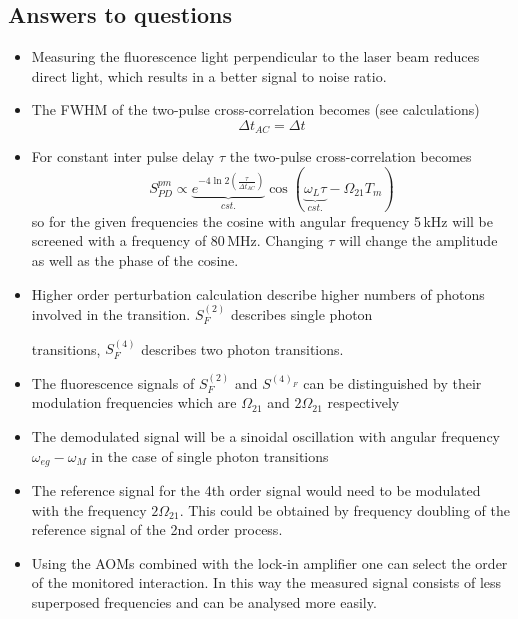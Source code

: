 \documentclass{report}
\begin{document}
\subsection*{Answers to questions}
  \begin{itemize}
    \item Measuring the fluorescence light perpendicular to the laser beam
      reduces direct light, which results in a
      better signal to noise ratio.

    \item The FWHM of the two-pulse cross-correlation 
      becomes (see calculations)
      $$ \Delta t_{AC} = \Delta t$$

    \item For constant inter pulse delay $\tau$ the two-pulse
      cross-correlation becomes
      $$ S^{pm}_{PD} \propto \underbrace{e^{-4\ln2\left(\frac{\tau}{\Delta
        t_{AC}}\right)}}_{cst.} \cos(\underbrace{\omega_L
      \tau}_{cst.}  - \Omega_{21}T_m )$$
      so for the given frequencies the cosine with angular frequency 5\,kHz
      will be screened with a frequency of 80\,MHz. Changing $\tau$ will
      change the amplitude as well as the phase of the cosine.

    \item Higher order perturbation calculation describe higher numbers of
      photons involved in the transition. $S^{(2)}_F$ describes single photon

      transitions, $S^{(4)}_F$ describes two photon transitions.
    \item The fluorescence signals of $S^{(2)}_F$ and $S^{(4)_F}$ can be
      distinguished by their modulation frequencies which are $\Omega_{21}$
      and $2\Omega_{21}$ respectively

    \item The demodulated signal will be a sinoidal oscillation with angular
      frequency $\omega_{eg} - \omega_M$ in the case of single photon
      transitions
      
    \item The reference signal for the 4th order signal would need to be
      modulated with the frequency $2 \Omega_{21}$. This could be obtained by
      frequency doubling of the reference signal of the 2nd order process.

    \item Using the AOMs combined with the lock-in amplifier one can select
      the order of the monitored interaction. In this way the measured signal
      consists of less superposed frequencies and can be analysed more easily.
  \end{itemize}
  
\end{document}
